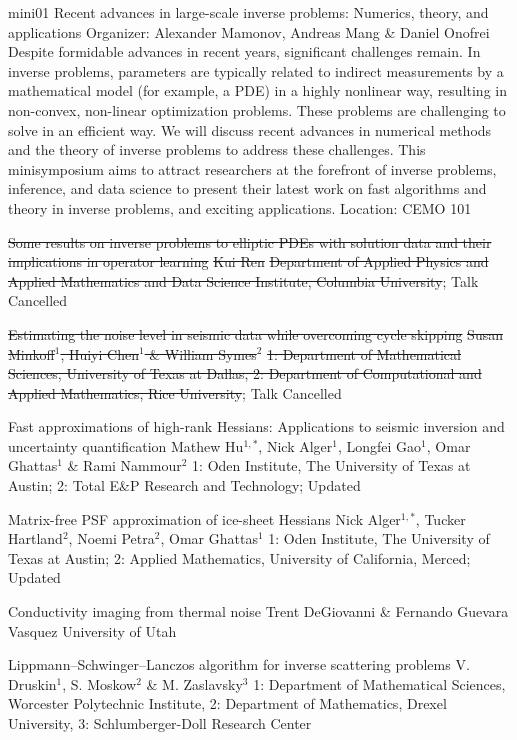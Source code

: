 \mini
{mini01}
{Recent advances in large-scale inverse problems: Numerics, theory, and applications}
{Organizer: Alexander Mamonov, Andreas Mang \& Daniel Onofrei}
{Despite formidable advances in recent years, significant challenges remain. In inverse problems, parameters are typically related to indirect measurements by a mathematical model (for example, a PDE) in a highly nonlinear way, resulting in non-convex, non-linear optimization problems. These problems are challenging to solve in an efficient way. We will discuss recent advances in numerical methods and the theory of inverse problems to address these challenges. This minisymposium aims to attract researchers at the forefront of inverse problems, inference, and data science to present their latest work on fast algorithms and theory in inverse problems, and exciting applications.}
{Location: CEMO 101}


\begin{talks}
\item\talk
{\st{Some results on inverse problems to elliptic {PDE}s with solution data and their implications in operator learning}}
{\st{Kui Ren}}
{\st{Department of Applied Physics and Applied Mathematics and Data Science Institute, Columbia University}; {\color{p1color}Talk Cancelled}}
\item\talk
{\st{Estimating the noise level in seismic data while overcoming cycle skipping}}
{\st{Susan Minkoff$^{1}$, Huiyi Chen$^{1}$ \& William Symes$^{2}$}}
{\st{1: Department of Mathematical Sciences, University of Texas at Dallas, 2:  Department of Computational and Applied Mathematics, Rice University}; {\color{p1color}Talk Cancelled}}
\item\talk
{Fast approximations of high-rank Hessians: Applications to seismic inversion and uncertainty quantification}
{Mathew Hu$^{1,*}$, Nick Alger$^{1}$, Longfei Gao$^{1}$, Omar Ghattas$^{1}$ \& Rami Nammour$^{2}$}
{1: Oden Institute, The University of Texas at Austin; 2: Total E\&P Research and Technology; {\color{p1color}Updated}}
\item\talk
{Matrix-free PSF approximation of ice-sheet Hessians}
{Nick Alger$^{1,*}$, Tucker Hartland$^{2}$, Noemi Petra$^{2}$, Omar Ghattas$^{1}$}
{1: Oden Institute, The University of Texas at Austin; 2: Applied Mathematics, University of California, Merced; {\color{p1color}Updated}}
\item\talk
{Conductivity imaging from thermal noise}
{Trent DeGiovanni \& Fernando Guevara Vasquez}
{University of Utah}
\item\talk
{{L}ippmann--{S}chwinger--{L}anczos algorithm for inverse scattering problems}
{V. Druskin$^{1}$, S. Moskow$^{2}$ \& M. Zaslavsky$^{3}$}
{1: Department of Mathematical Sciences, Worcester Polytechnic Institute, 2: Department of Mathematics, Drexel University, 3: Schlumberger-Doll Research Center}
\end{talks}
\room
